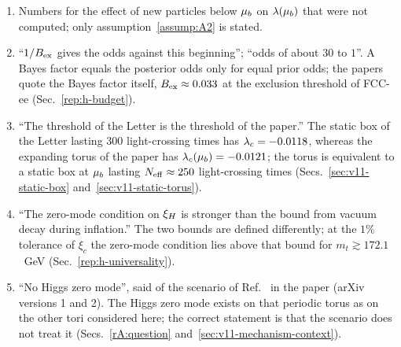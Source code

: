 \begin{enumerate}
\item Numbers for the effect of new particles below $\mu_b$ on $\lambda(\mu_b)$ that were not computed; only assumption~\ref{assump:A2} is stated.
\item ``$1/B_{\rm ex}$ gives the odds against this beginning''; ``odds of about $30$ to $1$''. A Bayes factor equals the posterior odds only for equal prior odds; the papers quote the Bayes factor itself, $B_{\rm ex}\approx0.033$ at the exclusion threshold of FCC-ee (Sec.~\ref{rep:h-budget}).
\item ``The threshold of the Letter is the threshold of the paper.'' The static box of the Letter lasting $300$ light-crossing times has $\lambda_c=-0.0118$, whereas the expanding torus of the paper has $\lambda_c(\mu_b)=-0.0121$; the torus is equivalent to a static box at $\mu_b$ lasting $N_{\rm eff}\approx250$ light-crossing times (Secs.~\ref{sec:v11-static-box} and~\ref{sec:v11-static-torus}). %
\item ``The zero-mode condition on $\xi_H$ is stronger than the bound from vacuum decay during inflation.'' The two bounds are defined differently; at the $1\%$ tolerance of $\xi_c$ the zero-mode condition lies above that bound for $m_t\gtrsim172.1$~GeV (Sec.~\ref{rep:h-universality}).
\item\label{ret:fornal} ``No Higgs zero mode'', said of the scenario of Ref.~\cite{Fornal:2026qfq} in the paper (arXiv versions 1 and 2). The Higgs zero mode exists on that periodic torus as on the other tori considered here; the correct statement is that the scenario does not treat it (Secs.~\ref{rA:question} and~\ref{sec:v11-mechanism-context}).
\end{enumerate}
